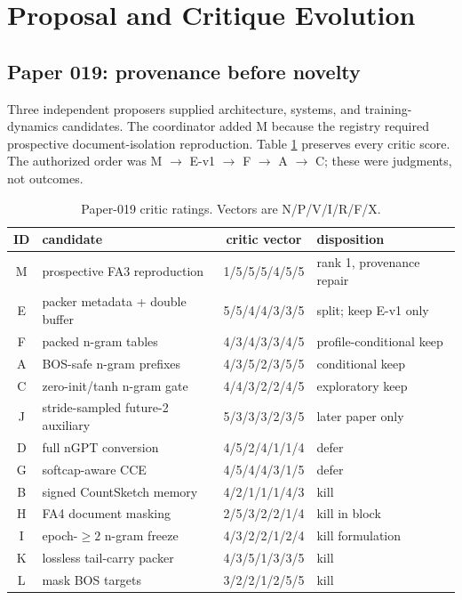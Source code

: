 \documentclass{article}
\begin{document}
\section{Proposal and Critique Evolution}

\subsection{Paper 019: provenance before novelty}

Three independent proposers supplied architecture, systems, and
training-dynamics candidates.  The coordinator added M because the registry
required prospective document-isolation reproduction.  Table
\ref{tab:p019} preserves every critic score.  The authorized order was
M $\rightarrow$ E-v1 $\rightarrow$ F $\rightarrow$ A $\rightarrow$ C;
these were judgments, not outcomes.

\begin{table}[t]
\caption{Paper-019 critic ratings.  Vectors are N/P/V/I/R/F/X.}
\label{tab:p019}
\centering\scriptsize
\begin{tabular}{clcl}
\toprule
ID & candidate & critic vector & disposition\\
\midrule
M & prospective FA3 reproduction & 1/5/5/5/4/5/5 & rank 1, provenance repair\\
E & packer metadata + double buffer & 5/5/4/4/3/3/5 & split; keep E-v1 only\\
F & packed n-gram tables & 4/3/4/3/3/4/5 & profile-conditional keep\\
A & BOS-safe n-gram prefixes & 4/3/5/2/3/5/5 & conditional keep\\
C & zero-init/tanh n-gram gate & 4/4/3/2/2/4/5 & exploratory keep\\
J & stride-sampled future-2 auxiliary & 5/3/3/3/2/3/5 & later paper only\\
D & full nGPT conversion & 4/5/2/4/1/1/4 & defer\\
G & softcap-aware CCE & 4/5/4/4/3/1/5 & defer\\
B & signed CountSketch memory & 4/2/1/1/1/4/3 & kill\\
H & FA4 document masking & 2/5/3/2/2/1/4 & kill in block\\
I & epoch-$\geq2$ n-gram freeze & 4/3/2/2/1/2/4 & kill formulation\\
K & lossless tail-carry packer & 4/3/5/1/3/3/5 & kill\\
L & mask BOS targets & 3/2/2/1/2/5/5 & kill\\
\bottomrule
\end{tabular}
\end{table}
\end{document}
